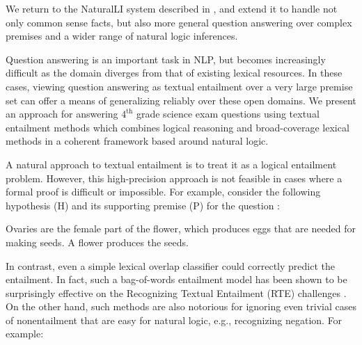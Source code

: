 
We return to the NaturalLI system described in , and extend it
  to handle not only common sense facts, but also more general question answering
  over complex premises and a wider range of natural logic inferences.

Question answering is an important task in NLP, but becomes
increasingly difficult as the domain diverges from that of existing lexical resources.
In these cases, viewing question answering as textual entailment over a
  very large premise set can offer a means of generalizing reliably over
  these open domains.
We present an approach for answering $4^\textrm{th}$ grade science exam questions
  using textual entailment methods which combines logical reasoning 
  and broad-coverage lexical methods in a coherent framework based around
  natural logic.

A natural approach to textual entailment
  is to treat it as a logical entailment problem.
However, this high-precision approach is not feasible in cases
    where a formal proof is difficult or impossible.
For example, consider the following hypothesis (H) 
  and its supporting premise (P)
  for the question :

\entailmentExample
{Ovaries are the female part of the flower, which produces eggs that are needed for making seeds.}
{A flower produces the seeds.}

In contrast, even a simple lexical overlap classifier could correctly predict
  the entailment.
In fact, such a bag-of-words entailment model has been shown to be surprisingly
  effective on the Recognizing Textual Entailment (RTE) challenges 
  \cite{key:2009maccartney-thesis}.
On the other hand, such methods are also notorious for ignoring even trivial 
  cases of nonentailment that are easy for natural logic, e.g., recognizing negation.
For example:

